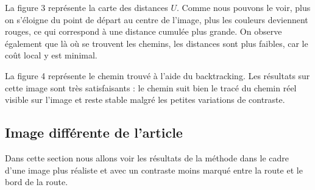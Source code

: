 \documentclass{article}
\begin{document}
La figure 3 représente la carte des distances $U$. Comme nous pouvons le voir, plus 
on s'éloigne du point de départ au centre de l'image, plus les couleurs deviennent 
rouges, ce qui correspond à une distance cumulée plus grande. On observe également que 
là où se trouvent les chemins, les distances sont plus faibles, car le coût local y 
est minimal.

La figure 4 représente le chemin trouvé à l'aide du backtracking. 
Les résultats sur cette image sont très satisfaisants : le chemin suit bien le tracé 
du chemin réel visible sur l'image et reste stable malgré les petites variations de contraste.



\subsection{Image différente de l'article}


Dans cette section nous allons voir les résultats de la méthode dans le cadre d'une
image plus réaliste et avec un contraste moins marqué entre la route et le bord de 
la route.
\end{document}
